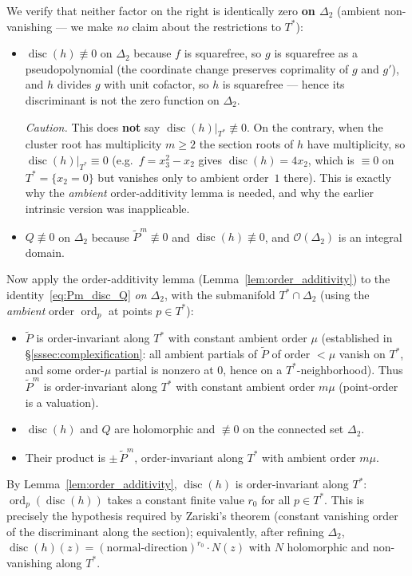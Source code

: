 \documentclass[11pt]{article}
\theoremstyle{plain}
\theoremstyle{definition}
\DeclareMathOperator{\ord}{ord}
\DeclareMathOperator{\disc}{disc}
\begin{document}
We verify that neither factor on the right is identically zero
\textbf{on $\Delta_2$} (ambient non-vanishing --- we make \emph{no} claim about
the restrictions to $T^*$):
\begin{itemize}
\item $\disc(h) \not\equiv 0$ on $\Delta_2$ because $f$ is squarefree, so $g$
  is squarefree as a pseudopolynomial (the coordinate change preserves
  coprimality of $g$ and $g'$), and $h$ divides $g$ with unit cofactor, so $h$
  is squarefree --- hence its discriminant is not the zero function on
  $\Delta_2$.

  \emph{Caution.} This does \textbf{not} say $\disc(h)|_{T^*} \not\equiv 0$.
  On the contrary, when the cluster root has multiplicity $m \ge 2$ the section
  roots of $h$ have multiplicity, so $\disc(h)|_{T^*} \equiv 0$ (e.g.\
  $f = x_3^2 - x_2$ gives $\disc(h) = 4x_2$, which is $\equiv 0$ on
  $T^* = \{x_2 = 0\}$ but vanishes only to ambient order~$1$ there).  This is
  exactly why the \emph{ambient} order-additivity lemma is needed, and why the
  earlier intrinsic version was inapplicable.
\item $Q \not\equiv 0$ on $\Delta_2$ because $\widetilde{P}^m \not\equiv 0$ and
  $\disc(h) \not\equiv 0$, and $\mathcal{O}(\Delta_2)$ is an integral domain.
\end{itemize}

Now apply the order-additivity lemma (Lemma~\ref{lem:order_additivity}) to the
identity~\eqref{eq:Pm_disc_Q} \emph{on $\Delta_2$}, with the submanifold
$T^* \cap \Delta_2$ (using the \emph{ambient} order $\ord_p$ at points
$p \in T^*$):
\begin{itemize}
\item $\widetilde{P}$ is order-invariant along $T^*$ with constant ambient
  order $\mu$ (established in \S\ref{sssec:complexification}: all ambient
  partials of $\widetilde{P}$ of order $< \mu$ vanish on $T^*$, and some
  order-$\mu$ partial is nonzero at $0$, hence on a $T^*$-neighborhood).  Thus
  $\widetilde{P}^m$ is order-invariant along $T^*$ with constant ambient order
  $m\mu$ (point-order is a valuation).
\item $\disc(h)$ and $Q$ are holomorphic and $\not\equiv 0$ on the connected
  set $\Delta_2$.
\item Their product is $\pm\,\widetilde{P}^m$, order-invariant along $T^*$ with
  ambient order $m\mu$.
\end{itemize}
By Lemma~\ref{lem:order_additivity}, $\disc(h)$ is order-invariant along
$T^*$: $\ord_p(\disc(h))$ takes a constant finite value $r_0$ for all
$p \in T^*$.  This is precisely the hypothesis required by Zariski's theorem
(constant vanishing order of the discriminant along the section); equivalently,
after refining $\Delta_2$, $\disc(h)(z) = (\text{normal-direction})^{r_0} \cdot
N(z)$ with $N$ holomorphic and non-vanishing along $T^*$.
\end{document}
